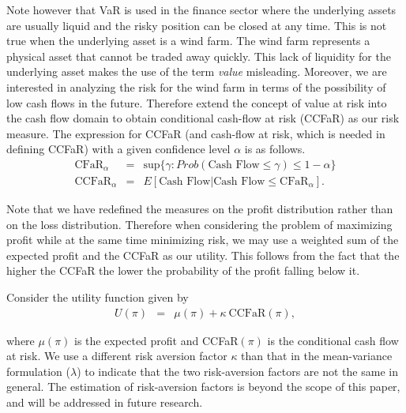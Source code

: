 Note however that VaR is used in the finance sector where the underlying assets are usually liquid and the risky position can be closed at any time. This is not true when the underlying asset is a wind farm. The wind farm represents a physical asset that cannot be traded away quickly. This lack of liquidity for the underlying asset makes the use of the term \emph{value} misleading. Moreover, we are interested in analyzing the risk for the wind farm in terms of the possibility of low cash flows in the future. Therefore extend the concept of value at risk into the cash flow domain to obtain conditional cash-flow at risk (CCFaR) \cite{prokopczuk_quantifying_2007} as our risk measure. The expression for CCFaR (and cash-flow at risk, which is needed in defining CCFaR) with a given confidence level $\alpha$ is as follows. 
\begin{equation}
\begin{array}{ccl}
\text{CFaR}_\alpha &=& \text{sup}\{ \gamma : Prob(\text{Cash Flow} \leq \gamma) \leq 1 - \alpha\} \\
\text{CCFaR}_\alpha &=& E \left[\text{Cash Flow} | \text{Cash Flow} \leq \text{CFaR}_\alpha \right].
\end{array}
\end{equation}

Note that we have redefined the measures on the profit distribution rather than on the loss distribution. Therefore when considering the problem of maximizing profit while at the same time minimizing risk, we may use a weighted sum of the expected profit and the CCFaR as our utility. This follows from the fact that the higher the CCFaR the lower the probability of the profit falling below it.

Consider the utility function given by
\begin{equation*}
	\begin{array}{ccl}
		U(\pi) &=& \mu (\pi) + \kappa \ \text{CCFaR}(\pi),
	\end{array}
\end{equation*}

\noindent where $\mu(\pi)$ is the expected profit and CCFaR$(\pi)$ is the conditional cash flow at risk. We use a different risk aversion factor $\kappa$ than that in the mean-variance formulation ($\lambda$) to indicate that the two risk-aversion factors are not the same in general. The estimation of risk-aversion factors is beyond the scope of this paper, and will be addressed in future research.

